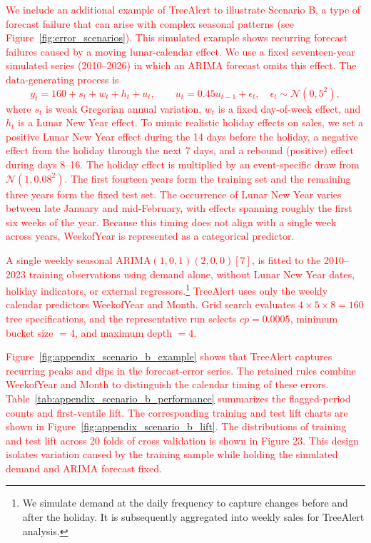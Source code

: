 \documentclass[]{interact}
\newcommand{\matt}[1]{\textcolor{red}{#1}}
\theoremstyle{definition}
\begin{document}
\matt{We include an additional example of TreeAlert to illustrate Scenario B, a type of forecast failure that can arise with complex seasonal patterns (see Figure~\ref{fig:error_scenarios}). This simulated example shows recurring forecast failures caused by a moving lunar-calendar effect. We use a fixed seventeen-year simulated series (2010--2026) in which an ARIMA forecast omits this effect. The data-generating process is
\begin{equation}
\label{eq:scenario_b_data_generating_process}
y_t=160+s_t+w_t+h_t+u_t, \qquad u_t=0.45u_{t-1}+\epsilon_t, \quad \epsilon_t\sim\mathcal{N}(0,5^2),
\end{equation}
where $s_t$ is weak Gregorian annual variation, $w_t$ is a fixed day-of-week effect, and $h_t$ is a Lunar New Year effect. To mimic realistic holiday effects on sales, we set a positive Lunar New Year effect during the 14 days before the holiday, a negative effect from the holiday through the next 7 days, and a rebound (positive) effect during days 8--16. The holiday effect is multiplied by an event-specific draw from $\mathcal{N}(1,0.08^2)$. The first fourteen years form the training set and the remaining three years form the fixed test set.}
\matt{The occurrence of Lunar New Year varies between late January and mid-February, with effects spanning roughly the first six weeks of the year. Because this timing does not align with a single week across years, WeekofYear is represented as a categorical predictor.}

\matt{A single weekly seasonal ARIMA$(1,0,1)(2,0,0)[7]$, is fitted to the 2010--2023 training observations using demand alone, without Lunar New Year dates, holiday indicators, or external regressors.\footnote{We simulate demand at the daily frequency to capture changes before and after the holiday. It is subsequently aggregated into weekly sales for TreeAlert analysis.} TreeAlert uses only the weekly calendar predictors WeekofYear and Month. Grid search evaluates $4\times5\times8=160$ tree specifications, and the representative run selects $cp=0.0005$, minimum bucket size $=4$, and maximum depth $=4$.}

\matt{Figure~\ref{fig:appendix_scenario_b_example} shows that TreeAlert captures recurring peaks and dips in the forecast-error series. The retained rules combine WeekofYear and Month to distinguish the calendar timing of these errors. Table~\ref{tab:appendix_scenario_b_performance} summarizes the flagged-period counts and first-ventile lift. The corresponding training and test lift charts are shown in Figure~\ref{fig:appendix_scenario_b_lift}. The distributions of training and test lift across 20 folds of cross validation is shown in Figure 23. This design isolates variation caused by the training sample while holding the simulated demand and ARIMA forecast fixed.}
\end{document}
